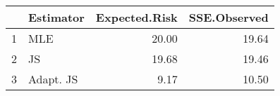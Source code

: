 \begin{table}[ht]
\centering
\begin{tabular}{rlrr}
  \hline
 & Estimator & Expected.Risk & SSE.Observed \\ 
  \hline
1 & MLE & 20.00 & 19.64 \\ 
  2 & JS & 19.68 & 19.46 \\ 
  3 & Adapt. JS & 9.17 & 10.50 \\ 
   \hline
\end{tabular}
\end{table}
